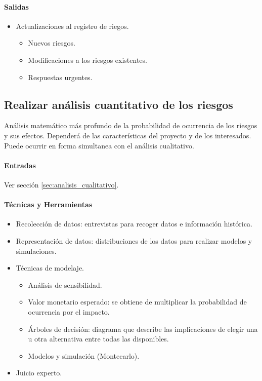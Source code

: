 \documentclass[a4paper,twosides]{article}
\newlength{\wideitemsep}
\let\olditem\item
\renewcommand{\item}{\setlength{\itemsep}{\wideitemsep}\olditem}
\begin{document}
\paragraph{Salidas}
\begin{itemize}
\item Actualizaciones al registro de riegos.
\begin{itemize}
\item Nuevos riesgos.
\item Modificaciones a los riesgos existentes.
\item Respuestas urgentes.
\end{itemize}
\end{itemize}
\subsection{Realizar análisis cuantitativo de los riesgos} \label{sec:analisis_cuantitativo}
Análisis matemático más profundo de la probabilidad de ocurrencia de los riesgos y sus efectos. Dependerá de las características del proyecto y de los interesados. Puede ocurrir en forma simultanea con el análisis cualitativo.

\paragraph{Entradas}
Ver sección \ref{sec:analisis_cualitativo}.

\paragraph{Técnicas y Herramientas}
\begin{itemize}
\item Recolección de datos: entrevistas para recoger datos e información histórica.
\item Representación de datos: distribuciones de los datos para realizar modelos y simulaciones.
\item Técnicas de modelaje.
\begin{itemize}
\item Análisis de sensibilidad.
\item Valor monetario esperado: se obtiene de multiplicar la probabilidad de ocurrencia por el impacto.
\item Árboles de decisión: diagrama que describe las implicaciones de elegir una u otra alternativa entre todas las disponibles.
\item Modelos y simulación (Montecarlo).
\end{itemize}
\item Juicio experto.
\end{itemize}
\end{document}
